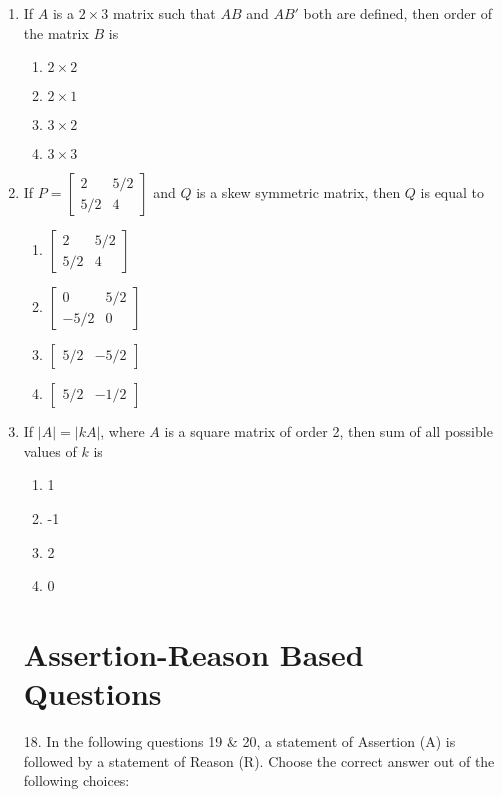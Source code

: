 \documentclass{article}
\begin{document}
\begin{enumerate}
\item If $A$ is a $2 \times 3$ matrix such that $AB$ and $AB'$ both are defined, then order of the matrix $B$ is
\begin{enumerate}
\item $2 \times 2$
\item $2 \times 1$
\item $3 \times 2$
\item $3 \times 3$
\end{enumerate}

\item If $P = \begin{bmatrix} 2 & 5/2 \\ 5/2 & 4 \end{bmatrix}$ and $Q$ is a skew symmetric matrix, then $Q$ is equal to
\begin{enumerate}
\item $\begin{bmatrix} 2 & 5/2 \\ 5/2 & 4 \end{bmatrix}$
\item $\begin{bmatrix} 0 & 5/2 \\ -5/2 & 0 \end{bmatrix}$
\item $\begin{bmatrix} 5/2 & -5/2 \end{bmatrix}$
\item $\begin{bmatrix} 5/2 & -1/2 \end{bmatrix}$
\end{enumerate}

\item If $|A| = |kA|$, where $A$ is a square matrix of order 2, then sum of all possible values of $k$ is
\begin{enumerate}
\item 1
\item -1
\item 2
\item 0
\end{enumerate}
\section*{Assertion-Reason Based Questions}
\item[18.]In the following questions 19 \& 20, a statement of Assertion (A) is followed by a statement of Reason (R). Choose the correct answer out of the following choices:


\end{enumerate}
\end{document}
